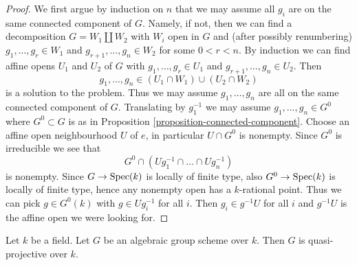 \begin{proof}
We first argue by induction on $n$ that we may assume all $g_i$ are
on the same connected component of $G$. Namely, if not, then we can
find a decomposition $G = W_1 \amalg W_2$ with $W_i$ open in $G$ and
(after possibly renumbering) $g_1, \ldots, g_r \in W_1$ and
$g_{r + 1}, \ldots, g_n \in W_2$ for some $0 < r < n$. By
induction we can find affine opens $U_1$ and $U_2$ of $G$ with
$g_1, \ldots, g_r \in U_1$ and $g_{r + 1}, \ldots, g_n \in U_2$.
Then
$$
g_1, \ldots, g_n \in (U_1 \cap W_1) \cup (U_2 \cap W_2)
$$
is a solution to the problem. Thus we may assume $g_1, \ldots, g_n$
are all on the same connected component of $G$. Translating by $g_1^{-1}$
we may assume $g_1, \ldots, g_n \in G^0$ where $G^0 \subset G$ is as in
Proposition \ref{proposition-connected-component}. Choose an affine
open neighbourhood $U$ of $e$, in particular $U \cap G^0$ is nonempty.
Since $G^0$ is irreducible we see that
$$
G^0 \cap (Ug_1^{-1} \cap \ldots \cap Ug_n^{-1})
$$
is nonempty. Since $G \to \mathop{\mathrm{Spec}}(k)$ is locally of finite type, also
$G^0 \to \mathop{\mathrm{Spec}}(k)$ is locally of finite type, hence any nonempty
open has a $k$-rational point. Thus we can pick $g \in G^0(k)$ with
$g \in Ug_i^{-1}$ for all $i$. Then $g_i \in g^{-1}U$ for all $i$
and $g^{-1}U$ is the affine open we were looking for.
\end{proof}

\begin{lemma}
\label{lemma-algebraic-quasi-projective}
Let $k$ be a field. Let $G$ be an algebraic group scheme over $k$.
Then $G$ is quasi-projective over $k$.
\end{lemma}

